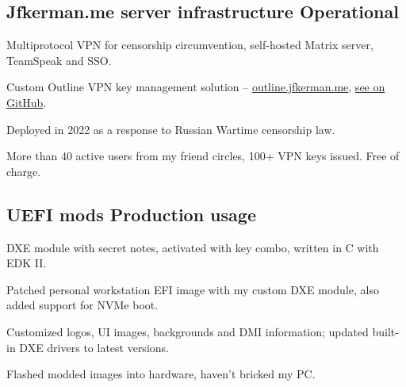 \documentclass[letter,10pt]{article}
\begin{document}
\subsection{{Jfkerman.me server infrastructure \hfill Operational}}
\begin{zitemize}
\item Multiprotocol VPN for censorship circumvention, self-hosted Matrix server, TeamSpeak and SSO.
\item Custom Outline VPN key management solution -- \url{outline.jfkerman.me}, \href{https://github.com/ThePetrovich/jfkerman_outline}{see on GitHub}. 
\item Deployed in 2022 as a response to Russian Wartime censorship law.
\item More than 40 active users from my friend circles, 100+ VPN keys issued. Free of charge.
\end{zitemize}

\subsection{{UEFI mods \hfill Production usage}}
\begin{zitemize}
\item DXE module with secret notes, activated with key combo, written in C with EDK II.
\item Patched personal workstation EFI image with my custom DXE module, also added support for NVMe boot.
\item Customized logos, UI images, backgrounds and DMI information; updated built-in DXE drivers to latest versions. 
\item Flashed modded images into hardware, haven't bricked my PC.
\end{zitemize}
\end{document}
